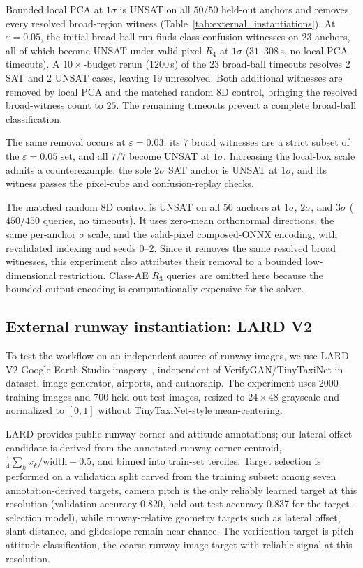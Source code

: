 \documentclass[twocolumn,smallextended,runningheads]{svjour3}
\begin{document}
Bounded local PCA at $1\sigma$ is UNSAT on all $50/50$ held-out anchors and removes every resolved broad-region witness (Table~\ref{tab:external_instantiations}). At $\varepsilon{=}0.05$, the initial broad-ball run finds class-confusion witnesses on $23$ anchors, all of which become UNSAT under valid-pixel $R_4$ at $1\sigma$ ($31$--$308$\,s, no local-PCA timeouts). A $10\times$-budget rerun ($1200$\,s) of the $23$ broad-ball timeouts resolves 2 SAT and 2 UNSAT cases, leaving $19$ unresolved. Both additional witnesses are removed by local PCA and the matched random 8D control, bringing the resolved broad-witness count to $25$. The remaining timeouts prevent a complete broad-ball classification.

The same removal occurs at $\varepsilon{=}0.03$: its $7$ broad witnesses are a strict subset of the $\varepsilon{=}0.05$ set, and all $7/7$ become UNSAT at $1\sigma$. Increasing the local-box scale admits a counterexample: the sole $2\sigma$ SAT anchor is UNSAT at $1\sigma$, and its witness passes the pixel-cube and confusion-replay checks.

The matched random 8D control is UNSAT on all $50$ anchors at $1\sigma$, $2\sigma$, and $3\sigma$ ($450/450$ queries, no timeouts). It uses zero-mean orthonormal directions, the same per-anchor $\sigma$ scale, and the valid-pixel composed-ONNX encoding, with revalidated indexing and seeds $0$--$2$. Since it removes the same resolved broad witnesses, this experiment also attributes their removal to a bounded low-dimensional restriction. Class-AE $R_3$ queries are omitted here because the bounded-output encoding is computationally expensive for the solver.

\subsection{External runway instantiation: LARD V2}
\label{sec:probe_lard}

To test the workflow on an independent source of runway images, we use LARD V2 Google Earth Studio imagery~\cite{bougacha2026lard2}, independent of VerifyGAN/TinyTaxiNet in dataset, image generator, airports, and authorship. The experiment uses 2000 training images and 700 held-out test images, resized to $24\times48$ grayscale and normalized to $[0,1]$ without TinyTaxiNet-style mean-centering.

LARD provides public runway-corner and attitude annotations; our lateral-offset candidate is derived from the annotated runway-corner centroid, $\frac{1}{4}\sum_k x_k/\mathrm{width}-0.5$, and binned into train-set terciles. Target selection is performed on a validation split carved from the training subset: among seven annotation-derived targets, camera pitch is the only reliably learned target at this resolution (validation accuracy $0.820$, held-out test accuracy $0.837$ for the target-selection model), while runway-relative geometry targets such as lateral offset, slant distance, and glideslope remain near chance. The verification target is pitch-attitude classification, the coarse runway-image target with reliable signal at this resolution.
\end{document}
